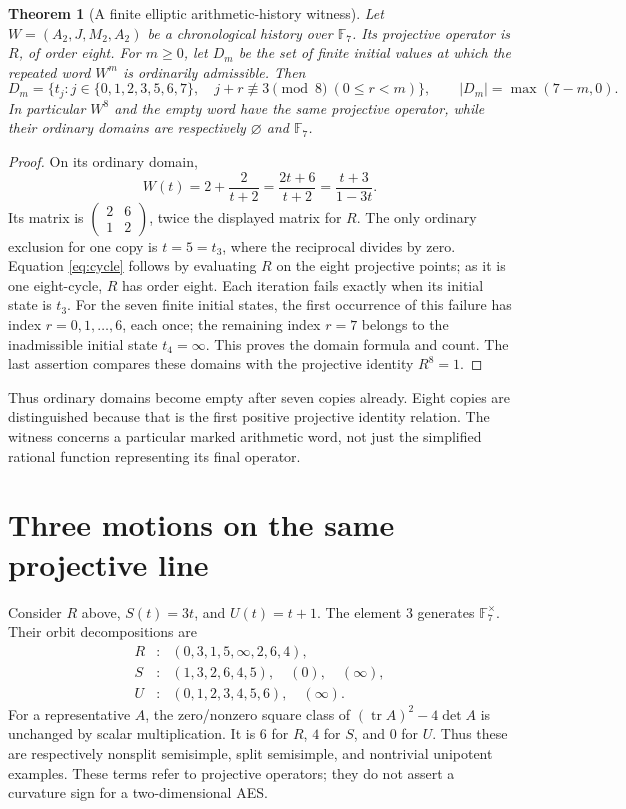 \documentclass[11pt]{article}
\newtheorem{theorem}{Theorem}[section]
\theoremstyle{definition}
\theoremstyle{remark}
\newcommand{\F}{\mathbb F}
\begin{document}
\begin{theorem}[A finite elliptic arithmetic-history witness]
\label{thm:history-witness}
Let $W=(A_2,J,M_2,A_2)$ be a chronological history over $\F_7$.
Its projective operator is $R$, of order eight. For $m\ge0$, let $D_m$
be the set of finite initial values at which the repeated word $W^m$ is
ordinarily admissible. Then
\[
 D_m=\{t_j:j\in\{0,1,2,3,5,6,7\},\quad
             j+r\not\equiv3\pmod8\ (0\le r<m)\},
 \qquad |D_m|=\max(7-m,0).
\]
In particular $W^8$ and the empty word have the same projective operator,
while their ordinary domains are respectively $\varnothing$ and $\F_7$.
\end{theorem}
\begin{proof}
On its ordinary domain,
\[
 W(t)=2+\frac2{t+2}=\frac{2t+6}{t+2}
      =\frac{t+3}{1-3t}.
\]
Its matrix is $\left(\begin{smallmatrix}2&6\\1&2\end{smallmatrix}\right)$,
twice the displayed matrix for $R$. The only ordinary exclusion for one
copy is $t=5=t_3$, where the reciprocal divides by zero. Equation
\eqref{eq:cycle} follows by evaluating $R$ on the eight projective points;
as it is one eight-cycle, $R$ has order eight. Each iteration fails exactly
when its initial state is $t_3$. For the seven finite initial states, the
first occurrence of this failure has index $r=0,1,\ldots,6$, each once;
the remaining index $r=7$ belongs to the inadmissible initial state
$t_4=\infty$. This proves the domain formula and count. The last assertion
compares these domains with the projective identity $R^8=1$.
\end{proof}

Thus ordinary domains become empty after seven copies already. Eight copies
are distinguished because that is the first positive projective identity
relation. The witness concerns a particular marked arithmetic word, not just
the simplified rational function representing its final operator.

\section{Three motions on the same projective line}\label{sec:three}
Consider $R$ above, $S(t)=3t$, and $U(t)=t+1$. The element $3$ generates
$\F_7^\times$. Their orbit decompositions are
\[
\begin{array}{ccl}
 R&:&(0,3,1,5,\infty,2,6,4),\\
 S&:&(1,3,2,6,4,5),\quad(0),\quad(\infty),\\
 U&:&(0,1,2,3,4,5,6),\quad(\infty).
\end{array}
\]
For a representative $A$, the zero/nonzero square class of
$(\operatorname{tr}A)^2-4\det A$ is unchanged by scalar multiplication.
It is $6$ for $R$, $4$ for $S$, and $0$ for $U$.
Thus these are respectively nonsplit semisimple, split semisimple, and
nontrivial unipotent examples. These terms refer to projective operators;
they do not assert a curvature sign for a two-dimensional AES.
\end{document}
